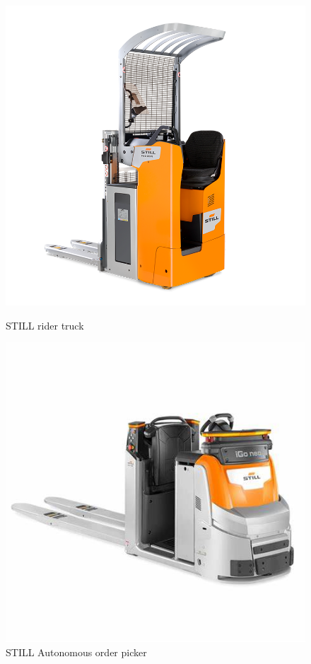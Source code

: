 \begin{figure}[H]
    \centering
    \begin{minipage}{0.45\textwidth}
        \centering
        \includegraphics[width=\linewidth]{images/Chap0/double-.png} %
        \caption{STILL rider truck}
        \label{double-}
    \end{minipage}
    \begin{minipage}{0.45\textwidth}
        \centering
        \includegraphics[width=\linewidth]{images/Chap0/iGoNeo.jpg} %
        \caption{STILL Autonomous order picker}
        \label{iGoNeo}
    \end{minipage}
\end{figure}

